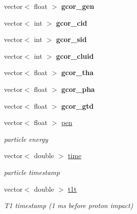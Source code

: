 \begin{DoxyCompactItemize}
\mbox{\label{classmbevts_aa6bfa795201f8ec0e7ff1e3bc44476f6}} 
vector$<$ float $>$ {\bfseries gcor\+\_\+gen}
\item 
\mbox{\label{classmbevts_ae9a9741e7ebab4fda511ec567f88fdfb}} 
vector$<$ int $>$ {\bfseries gcor\+\_\+cid}
\item 
\mbox{\label{classmbevts_a92de741a0530b18dbdc3e3aa304b145d}} 
vector$<$ int $>$ {\bfseries gcor\+\_\+sid}
\item 
\mbox{\label{classmbevts_a2b258390dff6790d71c059b95c61a953}} 
vector$<$ int $>$ {\bfseries gcor\+\_\+cluid}
\item 
\mbox{\label{classmbevts_a7ebaf557551a32ed4e3c0b738b6e3aaa}} 
vector$<$ float $>$ {\bfseries gcor\+\_\+tha}
\item 
\mbox{\label{classmbevts_a943c0c1658e8027b313abaf3f9070dff}} 
vector$<$ float $>$ {\bfseries gcor\+\_\+pha}
\item 
\mbox{\label{classmbevts_ac4cae232539c9a52f2f66e7246b26dcf}} 
vector$<$ float $>$ {\bfseries gcor\+\_\+gtd}
\item 
\mbox{\label{classmbevts_aad4e6745f1ac10979bef65cdb1bc20ff}} 
vector$<$ float $>$ \hyperlink{classmbevts_aad4e6745f1ac10979bef65cdb1bc20ff}{pen}
\begin{DoxyCompactList}\small\item\em particle energy \end{DoxyCompactList}\item 
\mbox{\label{classmbevts_aa9787e13cebc4ba3d86051e139785f83}} 
vector$<$ double $>$ \hyperlink{classmbevts_aa9787e13cebc4ba3d86051e139785f83}{time}
\begin{DoxyCompactList}\small\item\em particle timestamp \end{DoxyCompactList}\item 
\mbox{\label{classmbevts_af6b3a53709fd892151e864033e7aabf6}} 
vector$<$ double $>$ \hyperlink{classmbevts_af6b3a53709fd892151e864033e7aabf6}{t1t}
\begin{DoxyCompactList}\small\item\em T1 timestamp (1 ms before proton impact) \end{DoxyCompactList}\item 

\end{DoxyCompactItemize}

